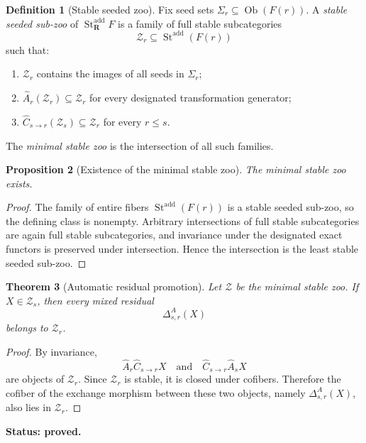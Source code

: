 \documentclass[11pt]{article}
\newtheorem{theorem}{Theorem}[section]
\newtheorem{proposition}[theorem]{Proposition}
\theoremstyle{definition}
\newtheorem{definition}[theorem]{Definition}
\theoremstyle{remark}
\newcommand{\Rcat}{\mathbf R}
\newcommand{\Ob}{\operatorname{Ob}}
\newcommand{\Seeds}{\Sigma}
\newcommand{\status}[1]{\textbf{Status: #1.}}
\begin{document}
\begin{definition}[Stable seeded zoo]
Fix seed sets $\Seeds_r\subseteq\Ob(F(r))$. A \emph{stable seeded sub-zoo} of $\operatorname{St}^{\mathrm{add}}_{\Rcat}F$ is a family of full stable subcategories
\[
\mathcal Z_r\subseteq\operatorname{St}^{\mathrm{add}}(F(r))
\]
such that:
\begin{enumerate}
    \item $\mathcal Z_r$ contains the images of all seeds in $\Seeds_r$;
    \item $\widehat A_r(\mathcal Z_r)\subseteq\mathcal Z_r$ for every designated transformation generator;
    \item $\widehat C_{s\to r}(\mathcal Z_s)\subseteq\mathcal Z_r$ for every $r\le s$.
\end{enumerate}
The \emph{minimal stable zoo} is the intersection of all such families.
\end{definition}

\begin{proposition}[Existence of the minimal stable zoo]\label{prop:min-stable-zoo}
The minimal stable zoo exists.
\end{proposition}

\begin{proof}
The family of entire fibers $\operatorname{St}^{\mathrm{add}}(F(r))$ is a stable seeded sub-zoo, so the defining class is nonempty. Arbitrary intersections of full stable subcategories are again full stable subcategories, and invariance under the designated exact functors is preserved under intersection. Hence the intersection is the least stable seeded sub-zoo.
\end{proof}

\begin{theorem}[Automatic residual promotion]\label{thm:auto-promotion}
Let $\mathcal Z$ be the minimal stable zoo. If $X\in\mathcal Z_s$, then every mixed residual
\[
\Delta^A_{s,r}(X)
\]
belongs to $\mathcal Z_r$.
\end{theorem}

\begin{proof}
By invariance,
\[
\widehat A_r\widehat C_{s\to r}X
\quad\text{and}\quad
\widehat C_{s\to r}\widehat A_sX
\]
are objects of $\mathcal Z_r$. Since $\mathcal Z_r$ is stable, it is closed under cofibers. Therefore the cofiber of the exchange morphism between these two objects, namely $\Delta^A_{s,r}(X)$, also lies in $\mathcal Z_r$.
\end{proof}

\status{proved}
\end{document}
